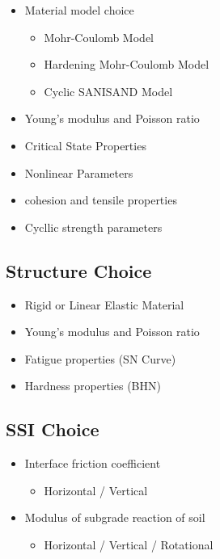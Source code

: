 \documentclass[
  letterpaper,
  DIV=11,
  numbers=noendperiod]{scrreprt}
\providecommand{\tightlist}{%
  \setlength{\itemsep}{0pt}\setlength{\parskip}{0pt}}\usepackage{longtable,booktabs,array}
\begin{document}
\begin{itemize}
\tightlist
\item
  Material model choice

  \begin{itemize}
  \tightlist
  \item
    Mohr-Coulomb Model
  \item
    Hardening Mohr-Coulomb Model
  \item
    Cyclic SANISAND Model
  \end{itemize}
\item
  Young's modulus and Poisson ratio
\item
  Critical State Properties
\item
  Nonlinear Parameters
\item
  cohesion and tensile properties
\item
  Cycllic strength parameters
\end{itemize}

\hypertarget{structure-choice}{%
\subsection{Structure Choice}\label{structure-choice}}

\begin{itemize}
\tightlist
\item
  Rigid or Linear Elastic Material
\item
  Young's modulus and Poisson ratio
\item
  Fatigue properties (SN Curve)
\item
  Hardness properties (BHN)
\end{itemize}

\hypertarget{ssi-choice}{%
\subsection{SSI Choice}\label{ssi-choice}}

\begin{itemize}
\tightlist
\item
  Interface friction coefficient

  \begin{itemize}
  \tightlist
  \item
    Horizontal / Vertical
  \end{itemize}
\item
  Modulus of subgrade reaction of soil

  \begin{itemize}
  \tightlist
  \item
    Horizontal / Vertical / Rotational
  \end{itemize}
\end{itemize}
\end{document}
